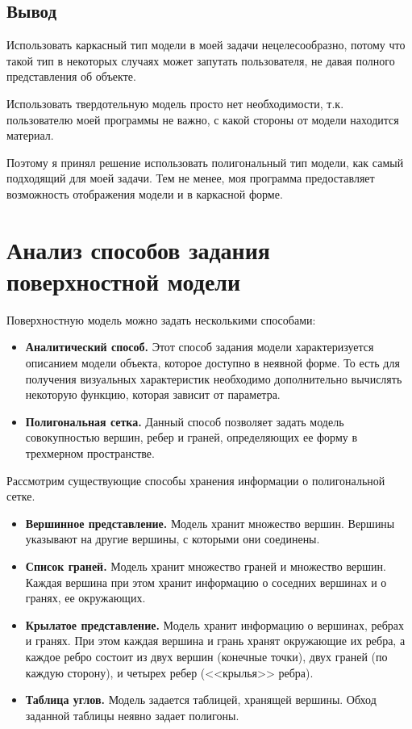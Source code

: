 \subsection*{Вывод}
Использовать каркасный тип модели в моей задачи нецелесообразно, потому что такой тип в некоторых случаях может запутать пользователя, не давая полного представления об объекте.

Использовать твердотельную модель просто нет необходимости, т.к. пользователю моей программы не важно, с какой стороны от модели находится материал.

Поэтому я принял решение использовать полигональный тип модели, как самый подходящий для моей задачи. Тем не менее, моя программа предоставляет возможность отображения модели и в каркасной форме.


\section{Анализ способов задания поверхностной модели}

Поверхностную модель можно задать несколькими способами:
\begin{itemize}[label=---]
	\item \textbf{Аналитический способ.} Этот способ задания модели характеризуется описанием модели объекта, которое доступно в неявной форме. То есть для получения визуальных характеристик необходимо дополнительно вычислять некоторую функцию, которая зависит от параметра.
	\item \textbf{Полигональная сетка.} Данный способ позволяет задать модель совокупностью вершин, ребер и граней, определяющих ее форму в трехмерном пространстве.
\end{itemize}

Рассмотрим существующие способы хранения информации о полигональной сетке.

\begin{itemize}[label=---]
	\item \textbf{Вершинное представление.} Модель хранит множество вершин. Вершины указывают на другие вершины, с которыми они соединены.
	\item \textbf{Список граней.} Модель хранит множество граней и множество вершин. Каждая вершина при этом хранит информацию о соседних вершинах и о гранях, ее окружающих.
 	\item \textbf{Крылатое представление.} Модель хранит информацию о вершинах, ребрах и гранях. При этом каждая вершина и грань хранят окружающие их ребра, а каждое ребро состоит из двух вершин (конечные точки), двух граней (по каждую сторону), и четырех ребер (<<крылья>> ребра).
	\item \textbf{Таблица углов.} Модель задается таблицей, хранящей вершины. Обход заданной таблицы неявно задает полигоны.
\end{itemize}

